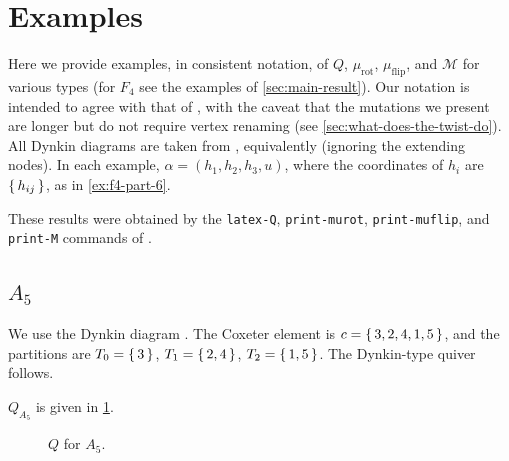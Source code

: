 \documentclass{amsart}
\theoremstyle{plain}
\theoremstyle{definition}
\theoremstyle{remark}
\newcommand{\conftoquiv}{\mathcal{M}}
\newcommand{\fundamentalweight}{\omega}
\newcommand{\genminor}[2]{\Delta^{{#1} \fundamentalweight_{#2}}}
\newcommand{\muflip}{{\mu_{\text{flip}}}}
\newcommand{\murot}{{\mu_{\text{rot}}}}
\newcommand{\inldynkinAfive}{\raisebox{-0.7ex}{}}
\begin{document}
  \section{Examples}

  \label{sec:examples}

  Here we provide examples, in consistent notation, of $Q$, $\murot$,
  $\muflip$, and $\conftoquiv$ for various types (for $F_4$ see the
  examples of \cref{sec:main-result}). Our notation is intended to agree
  with that of \cite{zickert2016}, with the caveat that the mutations we
  present are longer but do not require vertex renaming (see
  \cref{sec:what-does-the-twist-do}). All Dynkin diagrams are taken from
  \cite[Figure~2.4]{knapp1996}, equivalently
  \cite[Plates~II--IX]{bourbaki2002_46} (ignoring the extending nodes).
  In each example, $\alpha = (h_1, h_2, h_3, u)$, where the coordinates
  of $h_i$ are $\set{h_{ij}}$, as in \cref{ex:f4-part-6}.

  These results were obtained by the \texttt{latex-Q},
  \texttt{print-murot}, \texttt{print-muflip}, and \texttt{print-M}
  commands of \cite{gilles2020sw}.


  \subsection{\texorpdfstring{$A_5$}{A\_5}}

  We use the Dynkin diagram \inldynkinAfive. The Coxeter element is $c =
  \set{3, 2, 4, 1, 5}$, and the partitions are $T_0 = \set{3}$, $T_1 =
  \set{2, 4}$, $T_2 = \set{1, 5}$. The Dynkin-type quiver follows.

  {\centering 

  } $Q_{A_5}$ is given in \cref{fig:QA5}.

  \begin{figure}
    \centering 

    \caption{$Q$ for $A_5$.
      \label{fig:QA5}
    }
  \end{figure}
\end{document}
